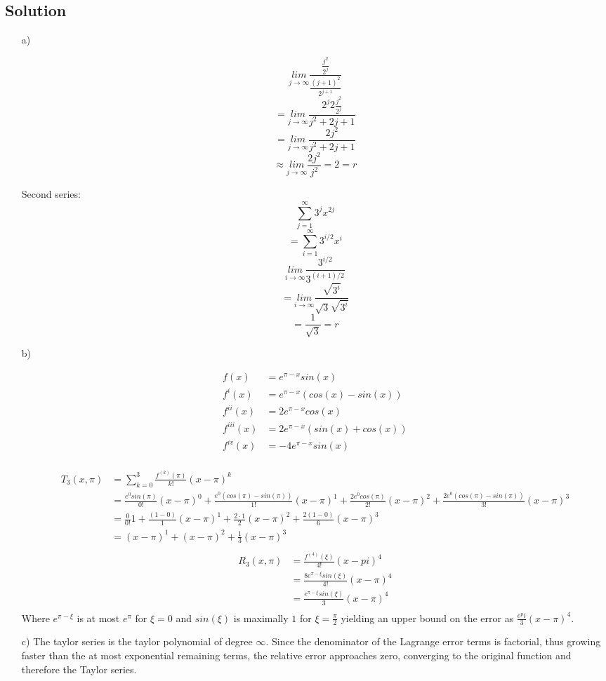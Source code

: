 \documentclass[10pt]{article}
\numberwithin{equation}{section}
\newcommand{\epix}{e^{\pi-x}}
\begin{document}
\subsection*{Solution}
\begin{enumerate}
  \item[a)]{
       $$\underset{j\rightarrow \infty}{lim} \frac{\frac{j^2}{2^j}}{\frac{(j+1)^2}{2^{j+1}}}$$
       $$=\underset{j\rightarrow \infty}{lim} \frac{2^j 2 \frac{j^2}{2^j}}{j^2 + 2j + 1}$$
       $$=\underset{j\rightarrow \infty}{lim} \frac{2 j^2}{j^2 + 2j + 1}$$
       $$\approx \underset{j\rightarrow \infty}{lim} \frac{2 j^2}{j^2} = 2 = r$$

       Second series:
       $$\sum_{j=1}^{\infty} 3^j x^{2j}$$
       $$=\sum_{i=1}^{\infty} 3^{i/2} x^i$$
       $$\underset{i\rightarrow \infty}{lim} \frac{3^{i/2}}{3^{(i+1)/2}}$$
       $$=\underset{i\rightarrow \infty}{lim} \frac{\sqrt{3^i}}{\sqrt{3}\sqrt{3^i}}$$
       $$=\frac{1}{\sqrt{3}} = r$$
    }
  \item[b)]{
    \begin{align*}
      f(x) &= \epix sin(x)\\
      f^i(x) &= \epix (cos(x) - sin(x))\\
      f^{ii}(x) &= 2\epix cos(x)\\
      f^{iii}(x) &= 2\epix (sin(x) + cos(x))\\
      f^{iv}(x) &= -4\epix sin(x)\\
    \end{align*}

    \begin{align*}
      T_3(x,\pi) &= \sum_{k=0}^3 \frac{f^{(k)}(\pi)}{k!}(x-\pi)^k\\
                 &= \frac{e^0 sin(\pi)}{0!}(x-\pi)^0 + \frac{e^0 (cos(\pi) - sin(\pi))}{1!}(x-\pi)^1 + \frac{2e^0 cos(\pi)}{2!}(x-\pi)^2 + \frac{2e^0 (cos(\pi) - sin(\pi))}{3!}(x-\pi)^3\\
                 &= \frac{0}{0!}1 + \frac{ (1 - 0)}{1}(x-\pi)^1 + \frac{2\cdot 1}{2}(x-\pi)^2 + \frac{2 (1 - 0)}{6}(x-\pi)^3\\
                 &= (x-\pi)^1 + (x-\pi)^2 + \frac{1}{3}(x-\pi)^3\\
    \end{align*}
    \begin{align*}
      R_3(x,\pi) &= \frac{f^{(4)}(\xi)}{4!}(x-pi)^4\\
                 &= \frac{8e^{\pi-\xi}sin(\xi)}{4!}(x-\pi)^4\\
                 &= \frac{e^{\pi-\xi}sin(\xi)}{3}(x-\pi)^4\\
    \end{align*}
    Where $e^{\pi-\xi}$ is at most $e^\pi$ for $\xi = 0$ and $sin(\xi)$ is maximally $1$ for $\xi = \frac{\pi}{2}$ yielding an upper bound on the error as $\frac{e^pi}{3}(x-\pi)^4$.

    }
  \item[c)]{
      The taylor series is the taylor polynomial of degree $\infty$.
      Since the denominator of the Lagrange error terms is factorial, thus growing faster than the at most exponential remaining terms, the relative error approaches zero, converging to the original function and therefore the Taylor series.
    }
\end{enumerate}
\end{document}
